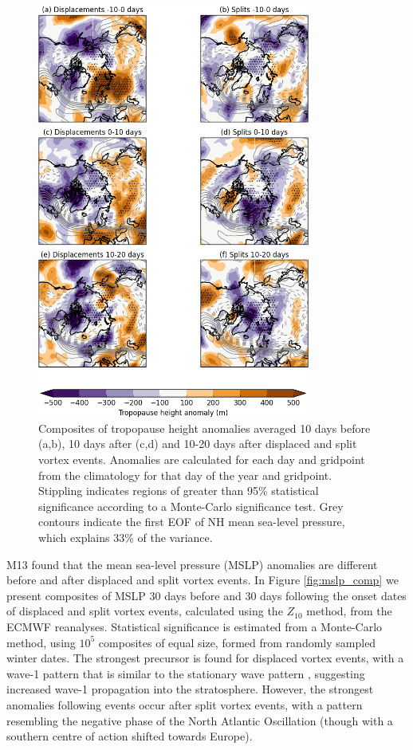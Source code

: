 \begin{figure}
 \centering
 \noindent\includegraphics[width=0.8\textwidth]{figures/chapter-moments/tropopause_height_composites_nam_crop.png}
 \caption[Tropopause height composites for split and displaced vortex
 events.]{Composites of tropopause height anomalies averaged 10 days before
   (a,b), 10 days after (c,d) and 10-20 days after displaced and split vortex
   events. Anomalies are calculated for each day and gridpoint from the
   climatology for that day of the year and gridpoint. Stippling indicates
   regions of greater than 95\% statistical significance according to a
   Monte-Carlo significance test. Grey contours indicate the first EOF of NH
   mean sea-level pressure, which explains 33\% of the variance.}
 \label{fig:tropopause_height}
\end{figure}



M13 found that the mean sea-level pressure (MSLP) anomalies are different before
and after displaced and split vortex events. In Figure \ref{fig:mslp_comp} we
present composites of MSLP 30 days before and 30 days following the onset dates
of displaced and split vortex events, calculated using the $Z_{10}$ method, from
the ECMWF reanalyses. Statistical significance is estimated from a Monte-Carlo
method, using $10^{5}$ composites of equal size, formed from randomly sampled
winter dates. The strongest precursor is found for displaced vortex events, with
a wave-1 pattern that is similar to the stationary wave pattern
\citep[e.g.][]{Garfinkel2008}, suggesting increased wave-1 propagation into the
stratosphere. However, the strongest anomalies following events occur after
split vortex events, with a pattern resembling the negative phase of the North
Atlantic Oscillation (though with a southern centre of action shifted towards
Europe).

